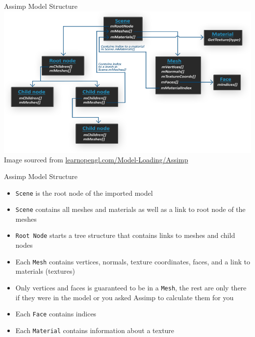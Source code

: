 \documentclass{beamer}
\begin{document}
\begin{frame}[fragile]{Assimp Model Structure}
    \includegraphics[width=\linewidth]{images/assimp_structure.png}
    {\footnotesize{Image sourced from \url{learnopengl.com/Model-Loading/Assimp}}}
\end{frame}

\begin{frame}[fragile]{Assimp Model Structure}
    \begin{itemize}
        \item {\color{blue}\verb"Scene"} is the root node of the imported model
        \item {\color{blue}\verb"Scene"} contains all meshes and materials as well as a link to root node of the meshes
        \item {\color{blue}\verb"Root Node"} starts a tree structure that contains links to meshes and child nodes
        \item Each {\color{blue}\verb"Mesh"} contains vertices, normals, texture coordinates, faces, and a link to
            materials (textures)
        \item Only vertices and faces is guaranteed to be in a {\color{blue}\verb"Mesh"}, the rest are only there if
            they were in the model or you asked Assimp to calculate them for you
        \item Each {\color{blue}\verb"Face"} contains indices
        \item Each {\color{blue}\verb"Material"} contains information about a texture
    \end{itemize}
\end{frame}
\end{document}
